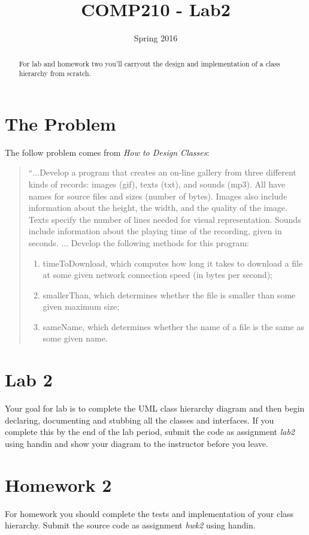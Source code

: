 \documentclass[]{tufte-handout}
\title{COMP210 - Lab2}
\author{}
\date{ Spring 2016 }
\begin{document}
\maketitle

\begin{abstract}
For lab and homework two you'll carryout the design and implementation of a class hierarchy from scratch. 
\end{abstract}

\section{The Problem}

The follow problem comes from \textit{How to Design Classes}:
\begin{quote}
``$\ldots$Develop a program that creates an on-line gallery from three
different kinds of records: images (gif), texts (txt), and sounds
(mp3). All have names for source files and sizes (number of
bytes). Images also include information about the height, the
width, and the quality of the image. Texts specify the number of
lines needed for visual representation. Sounds include information
about the playing time of the recording, given in seconds.
$\ldots$
Develop the following methods for this program:
\begin{enumerate}
\item timeToDownload, which computes how long it takes to download a file
at some given network connection speed (in bytes per second);
\item smallerThan, which determines whether the file is smaller than some
given maximum size;
\item sameName, which determines whether the name of a file is the same
as some given name.
\end{enumerate}
\end{quote}

\section{Lab 2}

Your goal for lab is to complete the UML class hierarchy diagram and then begin declaring, documenting and stubbing all the classes and interfaces. If you complete this by the end of the lab period, submit the code as assignment \textit{lab2} using handin and show your diagram to the instructor before you leave. 

\section{Homework 2}

For homework you should complete the tests and implementation of your class hierarchy.  Submit the source code as assignment \textit{hwk2} using handin.
\end{document}
